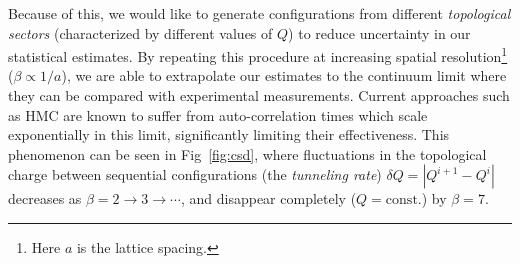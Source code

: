 \documentclass[a4paper,11pt]{article}
\begin{document}
Because of this, we would like to generate configurations from different
\textit{topological sectors} (characterized by different values of $Q$)
to reduce uncertainty in our statistical estimates.
%
By repeating this procedure at increasing spatial resolution\footnote{Here $a$ is the lattice spacing.} ($\beta \propto 1
/ a$), we are able to extrapolate our
estimates to the continuum limit where they can be compared with experimental
measurements.
%
Current approaches such as HMC are known to suffer from auto-correlation times
which scale exponentially in this limit, significantly limiting their
effectiveness.
%
This phenomenon can be seen in Fig~\ref{fig:csd}, where fluctuations in the
topological charge between sequential configurations (the \emph{tunneling rate}) $\delta Q = |Q^{i + 1} - Q^{i}|$ decreases as $\beta= 2
\rightarrow 3 \rightarrow \cdots$, and disappear completely ($Q =
\mathrm{const.}$) by $\beta = 7$.
%
%
\end{document}
